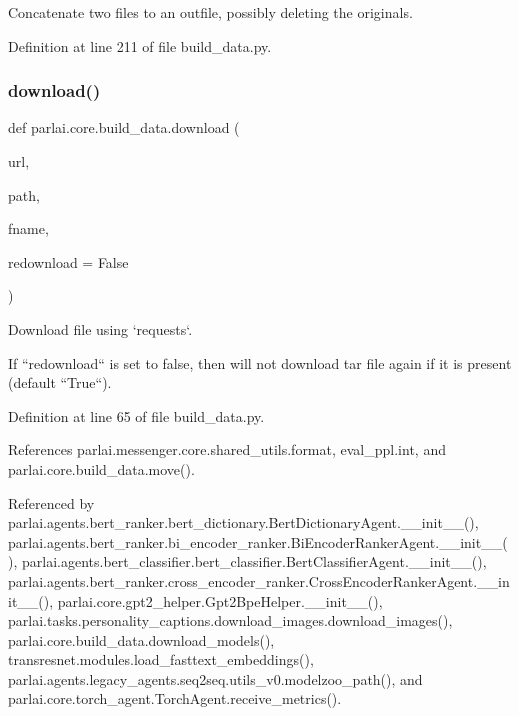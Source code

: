 \begin{DoxyVerb}Concatenate two files to an outfile, possibly deleting the originals.\end{DoxyVerb}
 

Definition at line 211 of file build\+\_\+data.\+py.

\mbox{\label{namespaceparlai_1_1core_1_1build__data_ab74f0e428f05e5d91fa93c8afb367622}} 
\subsubsection{\texorpdfstring{download()}{download()}}
{\footnotesize\ttfamily def parlai.\+core.\+build\+\_\+data.\+download (\begin{DoxyParamCaption}\item[{}]{url,  }\item[{}]{path,  }\item[{}]{fname,  }\item[{}]{redownload = {\ttfamily False} }\end{DoxyParamCaption})}

\begin{DoxyVerb}Download file using `requests`.

If ``redownload`` is set to false, then
will not download tar file again if it is present (default ``True``).
\end{DoxyVerb}
 

Definition at line 65 of file build\+\_\+data.\+py.



References parlai.\+messenger.\+core.\+shared\+\_\+utils.\+format, eval\+\_\+ppl.\+int, and parlai.\+core.\+build\+\_\+data.\+move().



Referenced by parlai.\+agents.\+bert\+\_\+ranker.\+bert\+\_\+dictionary.\+Bert\+Dictionary\+Agent.\+\_\+\+\_\+init\+\_\+\+\_\+(), parlai.\+agents.\+bert\+\_\+ranker.\+bi\+\_\+encoder\+\_\+ranker.\+Bi\+Encoder\+Ranker\+Agent.\+\_\+\+\_\+init\+\_\+\+\_\+(), parlai.\+agents.\+bert\+\_\+classifier.\+bert\+\_\+classifier.\+Bert\+Classifier\+Agent.\+\_\+\+\_\+init\+\_\+\+\_\+(), parlai.\+agents.\+bert\+\_\+ranker.\+cross\+\_\+encoder\+\_\+ranker.\+Cross\+Encoder\+Ranker\+Agent.\+\_\+\+\_\+init\+\_\+\+\_\+(), parlai.\+core.\+gpt2\+\_\+helper.\+Gpt2\+Bpe\+Helper.\+\_\+\+\_\+init\+\_\+\+\_\+(), parlai.\+tasks.\+personality\+\_\+captions.\+download\+\_\+images.\+download\+\_\+images(), parlai.\+core.\+build\+\_\+data.\+download\+\_\+models(), transresnet.\+modules.\+load\+\_\+fasttext\+\_\+embeddings(), parlai.\+agents.\+legacy\+\_\+agents.\+seq2seq.\+utils\+\_\+v0.\+modelzoo\+\_\+path(), and parlai.\+core.\+torch\+\_\+agent.\+Torch\+Agent.\+receive\+\_\+metrics().

